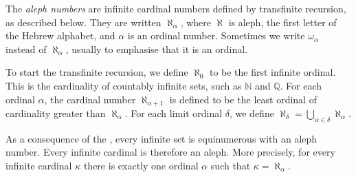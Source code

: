 \documentclass[12pt]{article}
\def\N{\mathbb{N}}
\def\Q{\mathbb{Q}}
\begin{document}

The \emph{aleph numbers} are infinite cardinal numbers 
defined by transfinite recursion, as described below.
They are written $\aleph_\alpha$, where $\aleph$ is aleph,
the first letter of the Hebrew alphabet,
and $\alpha$ is an ordinal number.
Sometimes we write $\omega_\alpha$ instead of $\aleph_\alpha$,
usually to emphasise that it is an ordinal.

To start the transfinite recursion, 
we define $\aleph_0$ to be the first infinite ordinal.
This is the cardinality of countably infinite sets, such as $\N$ and $\Q$.
For each ordinal $\alpha$,
the cardinal number $\aleph_{\alpha+1}$ is defined to be 
the least ordinal of cardinality greater than $\aleph_\alpha$.
For each limit ordinal $\delta$, 
we define $\aleph_\delta=\bigcup_{\alpha\in\delta}\aleph_\alpha$.

As a consequence of the ,
every infinite set is equinumerous with an aleph number.
Every infinite cardinal is therefore an aleph.
More precisely, for every infinite cardinal $\kappa$ there is exactly one ordinal $\alpha$ such that $\kappa=\aleph_\alpha$.
\end{document}
